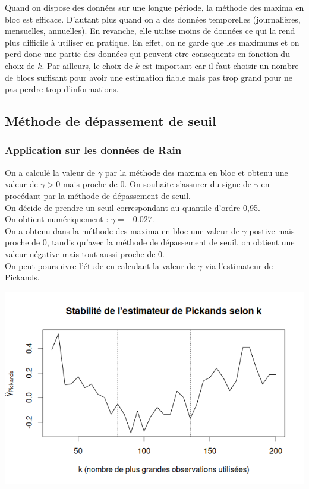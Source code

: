 \documentclass{article}
\theoremstyle{plain}
\theoremstyle{definition}
\theoremstyle{plain}
\begin{document}
Quand on dispose des données sur une longue période, la méthode des maxima en bloc est efficace. D'autant plus quand on a des données temporelles (journalières, mensuelles, annuelles).
En revanche, elle utilise moins de données ce qui la rend plus difficile à utiliser en pratique. En effet, on ne garde que les maximums et on perd donc une partie des données qui peuvent etre consequents en fonction du choix de $k$.
Par ailleurs, le choix de $k$ est important car il faut choisir un nombre de blocs suffisant pour avoir une estimation fiable mais pas trop grand pour ne pas perdre trop d'informations.

\subsection{Méthode de dépassement de seuil}


\subsubsection{Application sur les données de Rain}

On a calculé la valeur de $\gamma$ par la méthode des maxima en bloc et obtenu une valeur de $\gamma > 0 $ mais proche de 0. On souhaite s'assurer du signe de $\gamma$
en procédant par la méthode de dépassement de seuil.
\\
On décide de prendre un seuil correspondant au quantile d’ordre 0,95.
\\
On obtient numériquement : 
$\gamma  = -0.027$.
\\
On a obtenu dans la méthode des maxima en bloc une valeur de $\gamma$ postive mais proche de 0,
tandis qu'avec la méthode de dépassement de seuil, on obtient une valeur négative mais tout aussi proche de 0.
\\
On peut poursuivre l'étude en calculant la valeur de $\gamma$ via l'estimateur de Pickands.

\begin{center}
	\includegraphics[scale=0.57]{./images/pickandsrain.png} 
\end{center}
\end{document}
